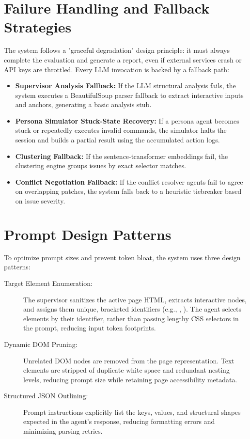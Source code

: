 \section{Failure Handling and Fallback Strategies}
\label{sec:failure-handling}

The system follows a "graceful degradation" design principle: it must always complete the evaluation and generate a report, even if external services crash or API keys are throttled. Every LLM invocation is backed by a fallback path:
\begin{itemize}
    \item \textbf{Supervisor Analysis Fallback:} If the LLM structural analysis fails, the system executes a BeautifulSoup parser fallback to extract interactive inputs and anchors, generating a basic analysis stub.
    \item \textbf{Persona Simulator Stuck-State Recovery:} If a persona agent becomes stuck or repeatedly executes invalid commands, the simulator halts the session and builds a partial result using the accumulated action logs.
    \item \textbf{Clustering Fallback:} If the sentence-transformer embeddings fail, the clustering engine groups issues by exact selector matches.
    \item \textbf{Conflict Negotiation Fallback:} If the conflict resolver agents fail to agree on overlapping patches, the system falls back to a heuristic tiebreaker based on issue severity.
\end{itemize}


\section{Prompt Design Patterns}
\label{sec:prompt-patterns}

To optimize prompt sizes and prevent token bloat, the system uses three design patterns:
\begin{description}
    \item[Target Element Enumeration:] The supervisor sanitizes the active page HTML, extracts interactive nodes, and assigns them unique, bracketed identifiers (e.g., \code{[1]}, \code{[2]}). The agent selects elements by their identifier, rather than passing lengthy CSS selectors in the prompt, reducing input token footprints.
    \item[Dynamic DOM Pruning:] Unrelated DOM nodes are removed from the page representation. Text elements are stripped of duplicate white space and redundant nesting levels, reducing prompt size while retaining page accessibility metadata.
    \item[Structured JSON Outlining:] Prompt instructions explicitly list the keys, values, and structural shapes expected in the agent's response, reducing formatting errors and minimizing parsing retries.
\end{description}
